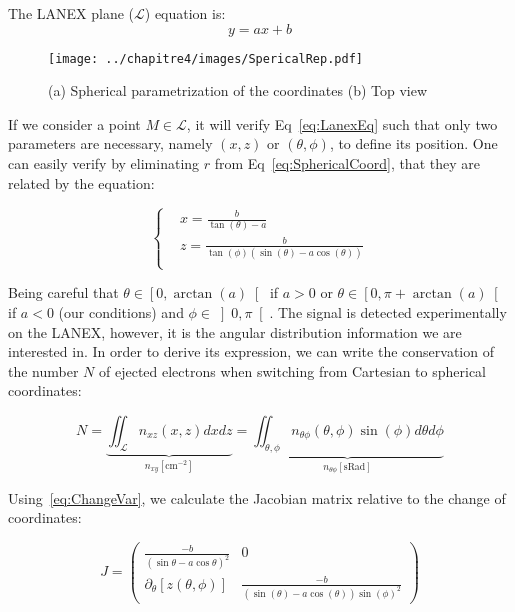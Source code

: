 \noindent The LANEX plane ($\mathcal{L}$) equation is:~
\begin{equation}
y = ax+b
\label{eq:LanexEq}
\end{equation}



\begin{figure}[H]
\centering
\texttt{[image: ../chapitre4/images/SpericalRep.pdf]}\\
\caption{\label{fig:SpericalRep}(a) Spherical parametrization of the coordinates (b) Top view}
\end{figure}




\noindent If we consider a point $M \in \mathcal{L}$, it will verify Eq~\ref{eq:LanexEq} such that only two parameters are necessary, namely $(x,z)$  or $(\theta,\phi)$, to define its position. One can easily verify by eliminating $r$ from Eq~\ref{eq:SphericalCoord}, that they are related by the equation:

\begin{equation}
\label{eq:ChangeVar}
  \left\{
      \begin{aligned}
      & x =\frac{b}{\tan(\theta)-a}\\
      & z = \frac{b}{\tan(\phi)(\sin(\theta)-a\cos(\theta))}\\
      \end{aligned}
    \right.
\end{equation}
 
\noindent Being careful that $\theta \in \left[ 0,\arctan(a) \right[$ if $a>0$ or $\theta \in \left[ 0,\pi+\arctan(a) \right[$ if $a<0$ (our conditions) and $\phi \in \left] 0,\pi \right[$.
The signal is detected experimentally on the LANEX, however, it is the angular distribution information we are interested in. In order to derive its expression, we can write the conservation of the number $N$ of ejected electrons when switching from Cartesian to spherical coordinates:

\begin{equation}
N = \underbrace{\iint_{\mathcal{L}}n_{xz}(x,z)dxdz}_{n_{xy}[\mathrm{cm}^{-2}]}=\underbrace{\iint_{\theta,\phi}n_{\theta \phi}(\theta,\phi)\sin(\phi)d\theta d\phi}_{n_{\theta\phi}[\mathrm{sRad}]}
\end{equation}

\noindent Using~\ref{eq:ChangeVar}, we calculate the Jacobian matrix relative to the change of coordinates:

\begin{equation}
J =  \left( \begin{array}{cc}
\frac{-b}{(\sin\theta- a\cos\theta)^2} & 0\\
\partial_{\theta}[z(\theta,\phi)] & \frac{-b}{(\sin(\theta)-a\cos(\theta))\sin(\phi)^2}
\end{array} \right)
\end{equation}



